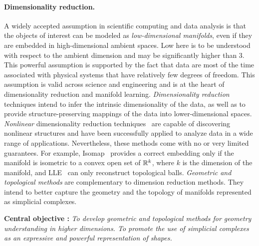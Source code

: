 \paragraph{Dimensionality reduction.} A widely accepted assumption in scientific computing and data analysis is that the objects of interest can be modeled as {\em low-dimensional manifolds}, even if they are embedded in high-dimensional ambient spaces. Low here is to be understood with respect to the ambient dimension and may be significantly higher than 3. This powerful assumption is supported by the fact that data are most of the time associated with physical systems that have relatively few degrees of freedom.  This assumption is valid across science and engineering and is at the heart of dimensionality reduction and manifold learning.
{\em Dimensionality reduction} techniques intend to infer the intrinsic dimensionality of the data, as well as to provide structure-preserving mappings of the data into lower-dimensional spaces. {\em Nonlinear} dimensionality reduction techniques~\cite{lv-nldr-2007} are capable of discovering {nonlinear} structures and have been successfully applied to analyze data in a wide range of applications.
Nevertheless, these methods come with no or very limited guarantees. For example, Isomap~\cite{tsl-isomap-2000} provides a correct embedding only if the manifold is isometric to a convex open set of $\mathbb R ^k$, where $k$ is the dimension of the manifold, and LLE~\cite{rs-lle-2000} can only reconstruct topological balls. {\em Geometric and topological methods} are complementary to dimension reduction methods. They intend to better capture the geometry and the topology of manifolds represented as simplicial complexes.

\vspace{2mm}  

{\bf Central objective :} {\em To develop geometric and topological methods for geometry understanding in higher dimensions.  To promote the use  of simplicial complexes as an expressive and powerful representation of shapes. }


